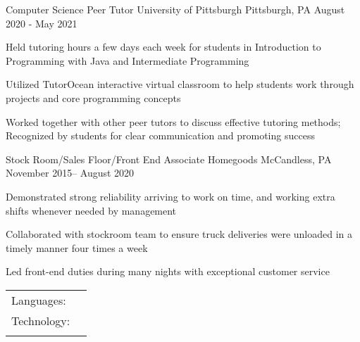 \documentclass[]{awesome-cv}
\begin{document}
\vspace{-2mm}
\begin{cventries}
	\cventry
	{Computer Science Peer Tutor}
	{University of Pittsburgh}
	{Pittsburgh, PA}
	{August 2020 - May 2021}
	{\begin{cvitems}
		\item {Held tutoring hours a few days each week for students in Introduction to Programming with Java and Intermediate Programming}
		\item {Utilized TutorOcean interactive virtual classroom to help students work through projects and core programming concepts}
		\item {Worked together with other peer tutors to discuss effective tutoring methods; Recognized by students for clear communication and promoting success}
		\end{cvitems}}
	\cventry
	{Stock Room/Sales Floor/Front End Associate}
	{Homegoods}
	{McCandless, PA}
	{November 2015– August 2020}
	{\begin{cvitems}
		\item {Demonstrated strong reliability arriving to work on time, and working extra shifts whenever needed by management}
		\item {Collaborated with stockroom team to ensure truck deliveries were unloaded in a timely manner four times a week }
		\item {Led front-end duties during many nights with exceptional customer service}
		\end{cvitems}}
\end{cventries}
\vspace{-4mm}
\begin{cventries}
	\cventry
	{}
	{\def\arraystretch{1.15}{\begin{tabular}{ l l }
		Languages:  & {\skill{ Java, SQL, HTML, CSS, JavaScript, PHP, Python}} \\
		Technology:  & {\skill{ Swagger, PostgreSQL, JUnit, Cucumber, Bootstrap, Flask, Git/Github, Docker, }} \\ &{\skill{ Google Cloud Platform, UNIX, Photoshop}} \\
		\end{tabular}}}
	{}
	{}
	{}
\end{cventries}
\end{document}
